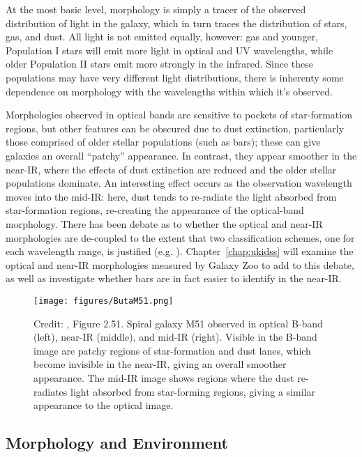 At the most basic level, morphology is simply a tracer of the observed distribution of light in the galaxy, which in turn traces the distribution of stars, gas, and dust. All light is not emitted equally, however: gas and younger, Population I stars will emit more light in optical and UV wavelengths, while older Population II stars emit more strongly in the infrared. Since these populations may have very different light distributions, there is inherenty some dependence on morphology with the wavelengths within which it's observed. 

Morphologies observed in optical bands are sensitive to pockets of star-formation regions, but other features can be obscured due to dust extinction, particularly those comprised of older stellar populations (such as bars); these can give galaxies an overall ``patchy'' appearance. In contrast, they appear smoother in the near-IR, where the effects of dust extinction are reduced and the older stellar populations dominate. An interesting effect occurs as the observation wavelength moves into the mid-IR: here, dust tends to re-radiate the light absorbed from star-formation regions, re-creating the appearance of the optical-band morphology. There has been debate as to whether the optical and near-IR morphologies are de-coupled to the extent that two classification schemes, one for each wavelength range, is justified (e.g. \citet{Block1999}). Chapter~\ref{chap:ukidss} will examine the optical and near-IR morphologies measured by Galaxy Zoo to add to this debate, as well as investigate whether bars are in fact easier to identify in the near-IR.

\begin{figure}
\centering
\texttt{[image: figures/ButaM51.png]}
\caption{Credit: \citet{Buta2013}, Figure 2.51. Spiral galaxy M51 observed in optical B-band (left), near-IR (middle), and mid-IR (right). Visible in the B-band image are patchy regions of star-formation and dust lanes, which become invisible in the near-IR, giving an overall smoother appearance. The mid-IR image shows regions where the dust re-radiates light absorbed from star-forming regions, giving a similar appearance to the optical image. }
\label{fig:buta51}
\end{figure} 

\subsection{Morphology and Environment}

